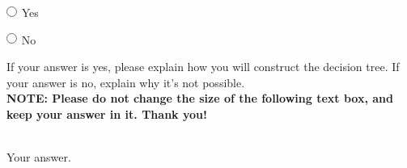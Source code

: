 \begin{enumerate}
    \begin{list}{}
        \item $\circle$ Yes
        \item $\circle$ No
    \end{list}
     If your answer is yes, please explain how you will construct the decision tree. If your answer is no, explain why it’s not possible.  \\
   
    \textbf{NOTE: Please do not change the size of the following text box, and keep your answer in it. Thank you!} \\ \\
    \begin{tcolorbox}[fit,height=4cm, width=15cm, blank, borderline={1pt}{-2pt},nobeforeafter]
    \large
    Your answer.

    \end{tcolorbox} \\
    
    

    

\end{enumerate}



